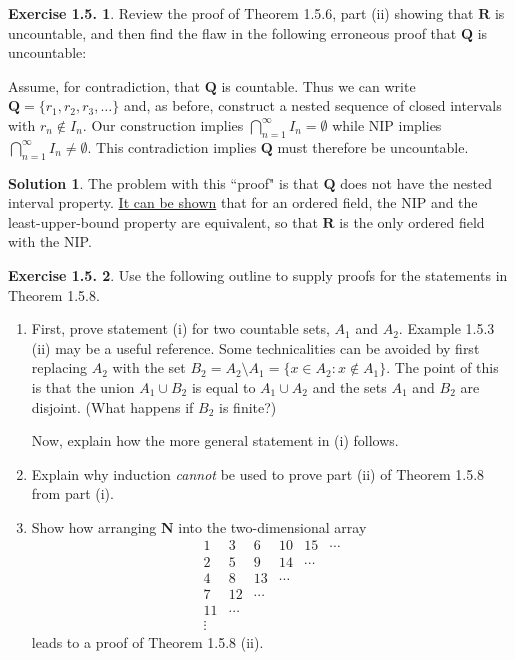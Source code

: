 \documentclass[12pt]{article}
\theoremstyle{definition}
\theoremstyle{exercise}
\newtheorem{exercise}{Exercise 1.5.}
\theoremstyle{solution}
\newtheorem*{solution}{Solution}
\newcommand{\N}{\mathbf{N}}
\newcommand{\Q}{\mathbf{Q}}
\newcommand{\R}{\mathbf{R}}
\begin{document}
\begin{exercise}
\label{ex:2}
    Review the proof of Theorem 1.5.6, part (ii) showing that \( \R \) is uncountable, and then find the flaw in the following erroneous proof that \( \Q \) is uncountable:

    Assume, for contradiction, that \( \Q \) is countable. Thus we can write \( \Q = \{ r_1, r_2, r_3, \ldots \} \) and, as before, construct a nested sequence of closed intervals with \( r_n \not\in I_n \). Our construction implies \( \bigcap_{n=1}^{\infty} I_n = \emptyset \) while NIP implies \( \bigcap_{n=1}^{\infty} I_n \neq \emptyset \). This contradiction implies \( \Q \) must therefore be uncountable.
\end{exercise}

\begin{solution}
    The problem with this ``proof" is that \( \Q \) does not have the nested interval property. \href{https://lew98.github.io/Mathematics/Nested_interval_property.pdf}{It can be shown} that for an ordered field, the NIP and the least-upper-bound property are equivalent, so that \( \R \) is the only ordered field with the NIP.
\end{solution}

\begin{exercise}
\label{ex:3}
    Use the following outline to supply proofs for the statements in Theorem 1.5.8.
    \begin{enumerate}
        \item First, prove statement (i) for two countable sets, \( A_1 \) and \( A_2 \). Example 1.5.3 (ii) may be a useful reference. Some technicalities can be avoided by first replacing \( A_2 \) with the set \( B_2 = A_2 \setminus A_1 = \{ x \in A_2 : x \not\in A_1 \} \). The point of this is that the union \( A_1 \cup B_2 \) is equal to \( A_1 \cup A_2 \) and the sets \( A_1 \) and \( B_2 \) are disjoint. (What happens if \( B_2 \) is finite?)

        Now, explain how the more general statement in (i) follows.

        \item Explain why induction \textit{cannot} be used to prove part (ii) of Theorem 1.5.8 from part (i).

        \item Show how arranging \( \N \) into the two-dimensional array
        \[
            \begin{matrix}
            1 & 3 & 6 & 10 & 15 & \cdots \\
            2 & 5 & 9 & 14 & \cdots &  \\
            4 & 8 & 13 & \cdots &  &  \\
            7 & 12 & \cdots &   &  &  \\
            11 & \cdots &  &  &  &  \\
            \vdots &  &  &  &  & 
            \end{matrix}
        \]
        leads to a proof of Theorem 1.5.8 (ii).
    \end{enumerate}
\end{exercise}
\end{document}
